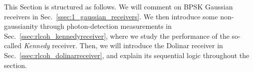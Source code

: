 This Section is structured as follows. We will comment on BPSK Gaussian receivers in Sec.~\ref{ssec:1_gaussian_receivers}. We then introduce some non-gaussianity through photon-detection measurements in Sec.~\ref{ssec:rlcoh_kennedyreceiver}, where we study the performance of the so-called \textit{Kennedy} receiver. Then, we will introduce the Dolinar receiver in Sec.~\ref{ssec:rlcoh_dolinarreceiver}, and explain its sequential logic throughout the section.
